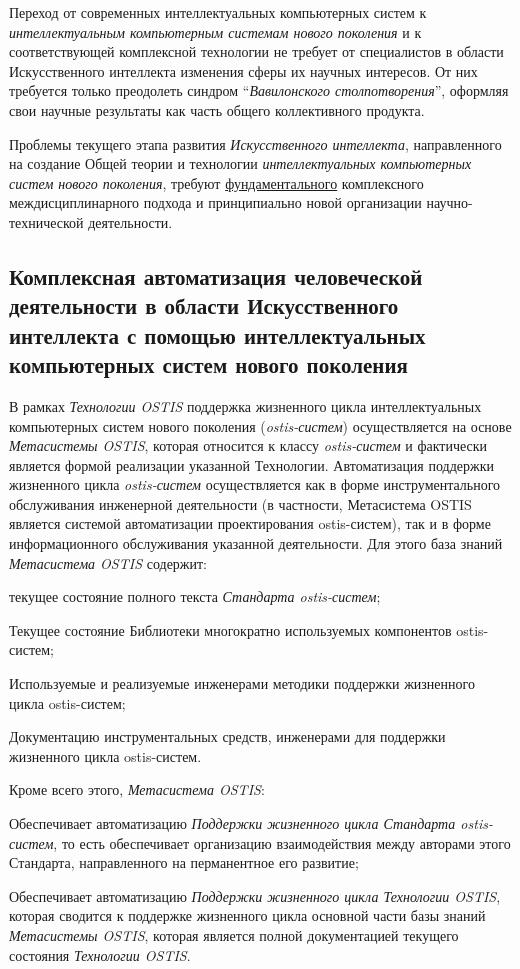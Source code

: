 Переход от современных интеллектуальных компьютерных систем к \textit{интеллектуальным компьютерным системам нового поколения} и к соответствующей комплексной технологии не требует от специалистов в области Искусственного интеллекта изменения сферы их научных интересов. От них требуется только преодолеть синдром ``\textit{Вавилонского столпотворения}'', оформляя свои научные результаты как часть общего коллективного продукта.

Проблемы текущего этапа развития \textit{Искусственного интеллекта}, направленного на создание Общей теории и технологии \textit{интеллектуальных компьютерных систем нового поколения}, требуют \underline{фундаментального} комплексного междисциплинарного подхода и принципиально новой организации научно-технической деятельности.

\subsection{Комплексная автоматизация человеческой деятельности в области Искусственного интеллекта с помощью интеллектуальных компьютерных систем нового поколения}

В рамках \textit{Технологии OSTIS} поддержка жизненного цикла интеллектуальных компьютерных систем нового поколения (\textit{ostis-систем}) осуществляется на основе \textit{Метасистемы OSTIS}, которая относится к классу \textit{ostis-систем} и фактически является формой реализации указанной Технологии. Автоматизация поддержки жизненного цикла \textit{ostis-систем} осуществляется как в форме инструментального обслуживания инженерной деятельности (в частности, Метасистема OSTIS является системой автоматизации проектирования ostis-систем), так и в форме информационного обслуживания указанной деятельности. Для этого база знаний \textit{Метасистема OSTIS} содержит: 
\begin{textitemize}
	\item текущее состояние полного текста \textit{Стандарта ostis-систем};
	\item Текущее состояние Библиотеки многократно используемых компонентов ostis-систем;
	\item Используемые и реализуемые инженерами методики поддержки жизненного цикла ostis-систем;
	\item Документацию инструментальных средств, инженерами для поддержки жизненного цикла  ostis-систем.
\end{textitemize}

Кроме всего этого, \textit{Метасистема OSTIS}: 
\begin{textitemize}
	\item Обеспечивает автоматизацию \textit{Поддержки жизненного цикла Стандарта ostis-систем}, то есть обеспечивает организацию взаимодействия между авторами этого Стандарта, направленного на перманентное его развитие;
	\item Обеспечивает автоматизацию \textit{Поддержки жизненного цикла Технологии OSTIS}, которая сводится к поддержке жизненного цикла основной части базы знаний \textit{Метасистемы OSTIS}, которая является полной документацией текущего состояния \textit{Технологии OSTIS}. 
\end{textitemize}

